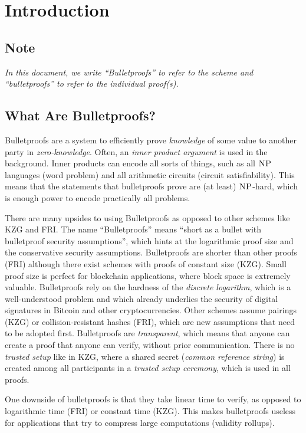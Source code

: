 \section{Introduction}

\subsection{Note}

\emph{In this document, we write \enquote{Bulletproofs} to refer to the scheme
and \enquote{bulletproofs} to refer to the individual proof(s).}

\subsection{What Are Bulletproofs?}

Bulletproofs are a system to efficiently prove \emph{knowledge} of some value to another party in \emph{zero-knowledge}.
Often, an \emph{inner product argument} is used in the background.
Inner products can encode all sorts of things,
such as all $\operatorname{\textsc{NP}}$ languages (word problem) and all arithmetic circuits (circuit satisfiability).
This means that the statements that bulletproofs prove are (at least) $\operatorname{\textsc{NP}}$-hard,
which is enough power to encode practically all problems.

There are many upsides to using Bulletproofs as opposed to other schemes like KZG and FRI.
The name \enquote{Bulletproofs} means \enquote{short as a bullet with bulletproof security assumptions},
which hints at the logarithmic proof size and the conservative security assumptions.
%
Bulletproofs are shorter than other proofs (FRI) although there exist schemes with proofs of constant size (KZG).
Small proof size is perfect for blockchain applications,
where block space is extremely valuable.
%
Bulletproofs rely on the hardness of the \emph{discrete logarithm},
which is a well-understood problem and which already underlies the security of digital signatures in Bitcoin and other cryptocurrencies.
Other schemes assume pairings (KZG) or collision-resistant hashes (FRI),
which are new assumptions that need to be adopted first.
%
Bulletproofs are \emph{transparent},
which means that anyone can create a proof that anyone can verify, without prior communication.
There is no \emph{trusted setup} like in KZG,
where a shared secret (\emph{common reference string}) is created among all participants in a \emph{trusted setup ceremony},
which is used in all proofs.

One downside of bulletproofs is that they take linear time to verify,
as opposed to logarithmic time (FRI) or constant time (KZG).
This makes bulletproofs useless for applications that try to compress large computations (validity rollups).

